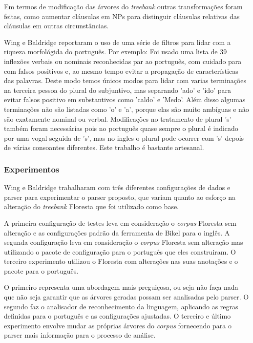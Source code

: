 Em termos de modificação das árvores do \emph{treebank} outras transformações foram feitas, como aumentar cláusulas em NPs para distinguir cláusulas relativas das cláusulas em outras circunstâncias.

Wing e Baldridge reportaram o uso de uma série de filtros para lidar com a riqueza morfológida do português. Por exemplo: Foi usado uma lista de 39 inflexões verbais ou nominais reconhecidas par ao português, com cuidado para com falsos positivos e, ao mesmo tempo evitar a propagação de características das palavras. Deste modo temos únicos modos para lidar com varias terminações na terceira pessoa do plural do subjuntivo, mas separando 'ado' e 'ido' para evitar falsos positivo em substantivos como 'caldo' e 'Medo'. Além disso algumas terminações não são listadas como 'o' e 'a', porque elas são muito ambíguas e não são exatamente nominal ou verbal. Modificações no tratamento de plural 's' também foram necessárias pois no português quase sempre o plural é indicado por uma vogal seguida de 's', mas no ingles o plural pode ocorrer com 's' depois de várias consoantes diferentes. Este trabalho é bastante artesanal.


\subsubsection{Experimentos} %
\label{sec:wing_baldridge_experimentos}

Wing e Baldridge trabalharam com três diferentes configurações de dados e parser para experimentar o parser proposto, que variam quanto ao esforço na alteração do \emph{treebank} Floresta que foi utilizado como base.

A primeira configuração de testes leva em consideração o \emph{corpus} Floresta sem alteração e as configurações padrão da ferramenta de Bikel para o inglês. A segunda configuração leva em consideração o \emph{corpus} Floresta sem alteração mas utilizando o pacote de configuração para o português que eles construiram. O terceiro experimento utilizou o Floresta com alterações nas suas anotações e o pacote para o português.

O primeiro representa uma abordagem mais preguiçosa, ou seja não faça nada que não seja garantir que as árvores geradas possam ser analisadas pelo parser. O segundo faz o analisador de reconhecimento da linguagem, aplicando as regras definidas para o português e as configurações ajustadas. O terceiro e último experimento envolve mudar as próprias árvores do \emph{corpus} fornecendo para o parser mais informação para o processo de análise.

